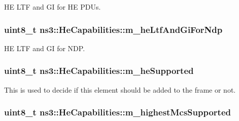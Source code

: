 HE L\+TF and GI for HE P\+D\+Us. 

\subsubsection[{\texorpdfstring{m\+\_\+he\+Ltf\+And\+Gi\+For\+Ndp}{m_heLtfAndGiForNdp}}]{\setlength{\rightskip}{0pt plus 5cm}uint8\+\_\+t ns3\+::\+He\+Capabilities\+::m\+\_\+he\+Ltf\+And\+Gi\+For\+Ndp\hspace{0.3cm}{\ttfamily [private]}}\hypertarget{classns3_1_1HeCapabilities_abf0323f232fa7a83f7450fc025d73162}{}\label{classns3_1_1HeCapabilities_abf0323f232fa7a83f7450fc025d73162}


HE L\+TF and GI for N\+DP. 

\subsubsection[{\texorpdfstring{m\+\_\+he\+Supported}{m_heSupported}}]{\setlength{\rightskip}{0pt plus 5cm}uint8\+\_\+t ns3\+::\+He\+Capabilities\+::m\+\_\+he\+Supported\hspace{0.3cm}{\ttfamily [private]}}\hypertarget{classns3_1_1HeCapabilities_aa17d6ec2845446ce11fffbbf5db024a7}{}\label{classns3_1_1HeCapabilities_aa17d6ec2845446ce11fffbbf5db024a7}


This is used to decide if this element should be added to the frame or not. 

\subsubsection[{\texorpdfstring{m\+\_\+highest\+Mcs\+Supported}{m_highestMcsSupported}}]{\setlength{\rightskip}{0pt plus 5cm}uint8\+\_\+t ns3\+::\+He\+Capabilities\+::m\+\_\+highest\+Mcs\+Supported\hspace{0.3cm}{\ttfamily [private]}}\hypertarget{classns3_1_1HeCapabilities_a85706b05f4879ec9a9343aaa00137a9e}{}\label{classns3_1_1HeCapabilities_a85706b05f4879ec9a9343aaa00137a9e}


